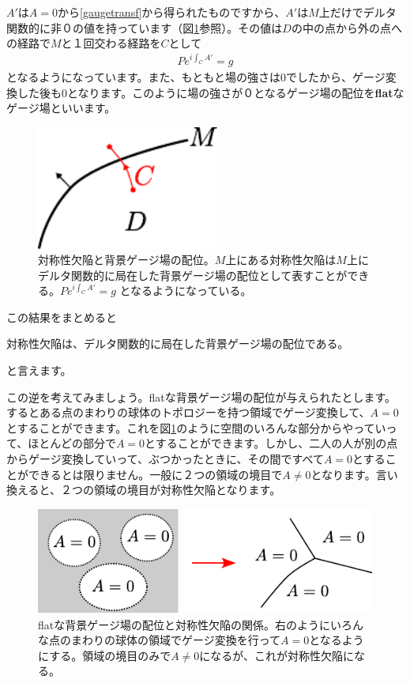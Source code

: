 \documentclass[report,paper=a4, fontsize=12pt, line_length=16cm, number_of_lines=33,dvipdfmx]{jlreq}
\newcommand{\kyou}[1]{{\sffamily \bfseries #1}}
\numberwithin{equation}{chapter}
\begin{document}
$A'$は$A=0$から\eqref{gaugetransf}から得られたものですから、$A'$は$M$上だけでデルタ関数的に非０の値を持っています（図\ref{fig:localizedgaugefield}参照）。その値は$D$の中の点から外の点への経路で$M$と１回交わる経路を$C$として
\begin{align}
  P e^{i\int_{C}A'} = g
\end{align}
となるようになっています。また、もともと場の強さは$0$でしたから、ゲージ変換した後も$0$となります。このように場の強さが０となるゲージ場の配位を\kyou{flat}なゲージ場といいます。

\begin{figure}
  \centering
  \includegraphics[width=6cm]{localizedgaugefield.pdf}
  \caption{対称性欠陥と背景ゲージ場の配位。$M$上にある対称性欠陥は$M$上にデルタ関数的に局在した背景ゲージ場の配位として表すことができる。$P e^{i\int_{C}A'} = g$ となるようになっている。}
  \label{fig:localizedgaugefield}
\end{figure}

この結果をまとめると
\begin{emphasize}
  対称性欠陥は、デルタ関数的に局在した背景ゲージ場の配位である。
\end{emphasize}
と言えます。

この逆を考えてみましょう。flatな背景ゲージ場の配位が与えられたとします。するとある点のまわりの球体のトポロジーを持つ領域でゲージ変換して、$A=0$とすることができます。これを図\ref{fig:localizedgaugefield}のように空間のいろんな部分からやっていって、ほとんどの部分で$A=0$とすることができます。しかし、二人の人が別の点からゲージ変換していって、ぶつかったときに、その間ですべて$A=0$とすることができるとは限りません。一般に２つの領域の境目で$A\ne 0$となります。言い換えると、２つの領域の境目が対称性欠陥となります。

\begin{figure}
  \centering
  \includegraphics{flatgaugefield.pdf}
  \caption{flatな背景ゲージ場の配位と対称性欠陥の関係。右のようにいろんな点のまわりの球体の領域でゲージ変換を行って$A=0$となるようにする。領域の境目のみで$A\ne 0$になるが、これが対称性欠陥になる。}
  \label{fig:flatgaugefield}
\end{figure}
\end{document}
